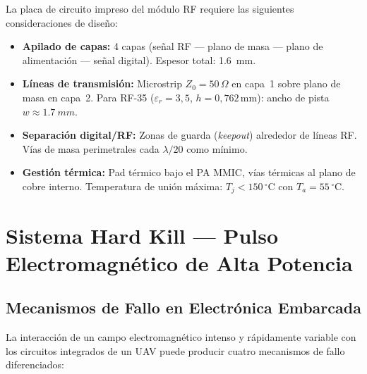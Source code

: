 \documentclass[12pt,a4paper]{article}
\begin{document}
La placa de circuito impreso del módulo RF requiere las siguientes
consideraciones de diseño:

\begin{itemize}
  \item \textbf{Apilado de capas:}
        4 capas (señal RF — plano de masa — plano de alimentación — señal digital).
        Espesor total: \SI{1.6}{mm}.
  \item \textbf{Líneas de transmisión:}
        Microstrip $Z_0 = 50\,\Omega$ en capa~1 sobre plano de masa en capa~2.
        Para RF-35 ($\varepsilon_r = 3{,}5$, $h = 0{,}762$\,mm):
        ancho de pista $w \approx \SI{1.7}{mm}$.
  \item \textbf{Separación digital/RF:}
        Zonas de guarda (\textit{keepout}) alrededor de líneas RF.
        Vías de masa perimetrales cada $\lambda/20$ como mínimo.
  \item \textbf{Gestión térmica:}
        Pad térmico bajo el PA MMIC, vías térmicas al plano de cobre interno.
        Temperatura de unión máxima: $T_j < 150\,^{\circ}$C con $T_a = 55\,^{\circ}$C.
\end{itemize}

\newpage

\section{Sistema Hard Kill — Pulso Electromagnético de Alta Potencia}

\subsection{Mecanismos de Fallo en Electrónica Embarcada}

La interacción de un campo electromagnético intenso y rápidamente
variable con los circuitos integrados de un UAV puede producir
cuatro mecanismos de fallo diferenciados:
\end{document}
